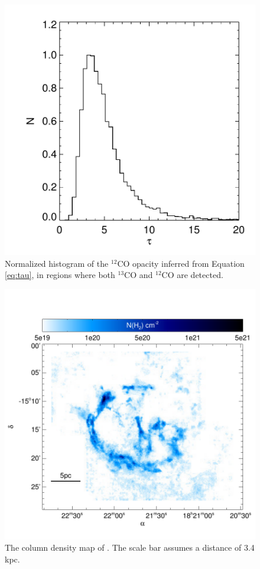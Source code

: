 \begin{figure}
\includegraphics{tau}
\caption{Normalized histogram of the $^{12}$CO opacity inferred from Equation \ref{eq:tau}, in regions where both $^{13}$CO and $^{12}$CO are detected.}
\label{fig:tau}
\end{figure}

\begin{figure}
\includegraphics{ncol}
\caption{The column density map of \snr{}. The scale bar assumes a distance of 3.4 kpc.}
\label{fig:ncol}
\end{figure}
